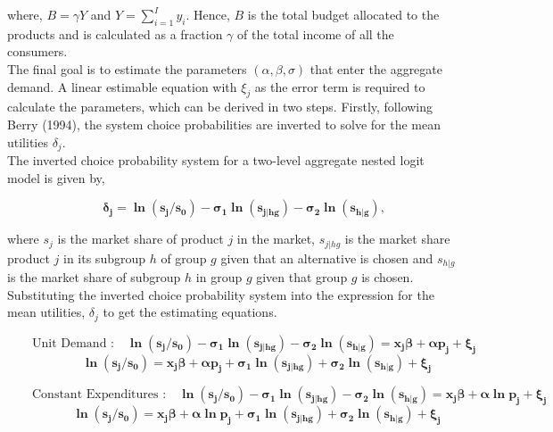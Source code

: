 \documentclass[a4paper,11pt]{article}
\begin{document}
    where, $B = \gamma Y$ and $Y = \sum_{i=1}^{I} y_{i}$. Hence, $B$ is the total budget allocated to the products and is calculated as a fraction $\gamma$ of the total income of all the consumers.\\

    The final goal is to estimate the parameters $(\alpha,\beta,\sigma)$ that enter the aggregate demand. A linear estimable equation with $\xi_{j}$ as the error term is required to calculate the parameters, which can be derived in two steps. Firstly, following Berry (1994), the system choice probabilities are inverted to solve for the mean utilities $\delta_{j}$.\\ 
    
    The inverted choice probability system for a two-level aggregate nested logit model is given by,

    \begin{equation*}
        \qquad \mathbf{\delta_{j} = \ln(s_{j}/s_{0}) - \sigma_{1}\ln(s_{j|hg}) - \sigma_{2}\ln(s_{h|g})},
    \end{equation*}

    where $s_{j}$ is the market share of product $j$ in the market, $s_{j|hg}$ is the market share product $j$ in its subgroup $h$ of group $g$ given that an alternative is chosen and $s_{h|g}$ is the market share of subgroup $h$ in group $g$ given that group $g$ is chosen.\\

    Substituting the inverted choice probability system into the expression for the mean utilities, $\delta_{j}$ to get the estimating equations.

    \begin{equation*}
        \qquad \text{Unit Demand :} \quad \mathbf{\ln(s_{j}/s_{0}) - \sigma_{1}\ln(s_{j|hg}) - \sigma_{2}\ln(s_{h|g}) = x_{j}\beta + \alpha p_{j} + \xi_{j}}
    \end{equation*}
    \begin{equation*}
        \qquad  \qquad \mathbf{\ln(s_{j}/s_{0}) = x_{j}\beta + \alpha p_{j} + \sigma_{1}\ln(s_{j|hg}) + \sigma_{2}\ln(s_{h|g}) + \xi_{j}}
    \end{equation*}
    
    \begin{equation*}
        \qquad \text{Constant Expenditures :} \quad \mathbf{\ln(s_{j}/s_{0}) - \sigma_{1}\ln(s_{j|hg}) - \sigma_{2}\ln(s_{h|g}) = x_{j}\beta + \alpha\ln p_{j} + \xi_{j}}
    \end{equation*}
    \begin{equation*}
        \qquad  \qquad \mathbf{\ln(s_{j}/s_{0}) = x_{j}\beta + \alpha \ln p_{j} + \sigma_{1}\ln(s_{j|hg}) + \sigma_{2}\ln(s_{h|g}) + \xi_{j}}
    \end{equation*}
    
\end{document}
